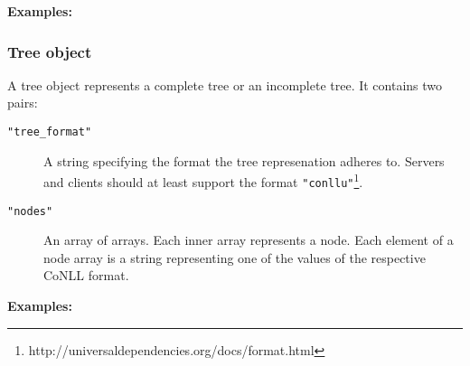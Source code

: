 \documentclass{scrartcl}
\newcommand{\jsstring}[1]{\texttt{\color{OrangeRed}"#1"}}
\newcommand{\Examples}{\noindent\textbf{Examples:}}
\begin{document}
\Examples





\subsubsection{Tree object}
\label{ssub:Tree object}

A tree object represents a complete tree or an incomplete tree.
It contains two pairs:
\begin{description}
    \item[\jsstring{tree\_format}] A string specifying the format the tree represenation adheres to.
        Servers and clients should at least support the format \jsstring{conllu}\footnote{http://universaldependencies.org/docs/format.html}.
    \item[\jsstring{nodes}] An array of arrays.
        Each inner array represents a node.
        Each element of a node array is a string representing one of the values of the respective CoNLL format.
\end{description}

\Examples


\end{document}
